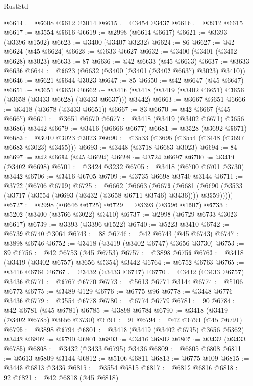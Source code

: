 \begin{lexlean}{RustStd}
\begin{coremodule}
@6614 := @6608 @6612 @3014
@6615 := @3454 @3437
@6616 := @3912 @6615
@6617 := @3554 @6616
@6619 := @2998 (@6614 @6617)
@6621 := @3393 (@3396 @1502)
@6623 := @3400 (@3407 @3232)
@6624 := 86
@6627 := @42 @6624 (@45 @6624)
@6628 := @3633 @6627
@6632 := @3400 (@3401 (@3402 @6628) @3023)
@6633 := 87
@6636 := @42 @6633 (@45 @6633)
@6637 := @3633 @6636
@6644 := @6623 (@6632 (@3400 (@3401 (@3402 @6637) @3023) @3410))
@6646 := @6621 @6644 @3023
@6647 := 85
@6650 := @42 @6647 (@45 @6647)
@6651 := @3651 @6650
@6662 := @3416 (@3418 (@3419 (@3402 @6651) @3656 (@3658 (@3433 @6628) (@3433 @6637))) @3442)
@6663 := @3667 @6651
@6666 := @3418 (@3678 (@3433 @6651))
@6667 := 83
@6670 := @42 @6667 (@45 @6667)
@6671 := @3651 @6670
@6677 := @3418 (@3419 (@3402 @6671) @3656 @3686) @3442
@6679 := @3416 (@6666 @6677)
@6681 := @3528 (@3692 @6671)
@6683 := @3010 @3023 @3023
@6690 := @3533 (@3696 (@3554 (@3448 (@3697 @6683 @3023) @3455)))
@6693 := @3448 (@3718 @6683 @3023)
@6694 := 84
@6697 := @42 @6694 (@45 @6694)
@6698 := @3724 @6697
@6700 := @3419 (@3402 @6698)
@6701 := @3424 @3232
@6705 := @3418 (@6700 @6701 @3730) @3442
@6706 := @3416 @6705
@6709 := @3735 @6698 @3740 @3144
@6711 := @3722 (@6706 @6709)
@6725 := @6662
    (@6663
      (@6679
        (@6681 (@6690 (@3533 (@3717 (@3554 (@6693 (@3432 (@3658 @6711 @3746) @3436)))) @3559)))))
@6727 := @2998 (@6646 @6725)
@6729 := @3393 (@3396 @1507)
@6733 := @5202 (@3400 (@3766 @3022) @3410)
@6737 := @2998 (@6729 @6733 @3023 @6617)
@6739 := @3393 (@3396 @1522)
@6740 := @5223 @3410
@6742 := @6739 @6740 @3064
@6743 := 88
@6746 := @42 @6743 (@45 @6743)
@6747 := @3898 @6746
@6752 := @3418 (@3419 (@3402 @6747) @3656 @3730)
@6753 := 89
@6756 := @42 @6753 (@45 @6753)
@6757 := @3898 @6756
@6763 := @3418 (@3419 (@3402 @6757) @3656 @5354) @3442
@6764 := @6752 @6763
@6765 := @3416 @6764
@6767 := @3432 (@3433 @6747)
@6770 := @3432 (@3433 @6757) @3436
@6771 := @6767 @6770
@6773 := @5613 @6771 @3144
@6774 := @5106 @6773
@6775 := @3489 @129
@6776 := @6775 @96
@6778 := @3448 @6776 @3436
@6779 := @3554 @6778
@6780 := @6774 @6779
@6781 := 90
@6784 := @42 @6781 (@45 @6781)
@6785 := @3898 @6784
@6790 := @3418 (@3419 (@3402 @6785) @3656 @3730)
@6791 := 91
@6794 := @42 @6791 (@45 @6791)
@6795 := @3898 @6794
@6801 := @3418 (@3419 (@3402 @6795) @3656 @5362) @3442
@6802 := @6790 @6801
@6803 := @3416 @6802
@6805 := @3432 (@3433 @6785)
@6808 := @3432 (@3433 @6795) @3436
@6809 := @6805 @6808
@6811 := @5613 @6809 @3144
@6812 := @5106 @6811
@6813 := @6775 @109
@6815 := @3448 @6813 @3436
@6816 := @3554 @6815
@6817 := @6812 @6816
@6818 := 92
@6821 := @42 @6818 (@45 @6818)

\end{coremodule}
\end{lexlean}
